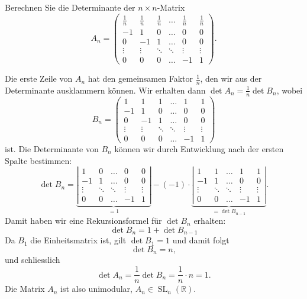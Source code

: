 Berechnen Sie die Determinante der $n\times n$-Matrix 
\[
A_n=\begin{pmatrix}
\frac1n& \frac1n& \frac1n&\dots & \frac1n& \frac1n\\
     -1&       1&       0&\dots &       0&       0\\
      0&      -1&       1&\dots &       0&       0\\
\vdots &\vdots  &\ddots  &\ddots& \vdots & \vdots \\
      0&       0&       0&\dots &      -1&       1
\end{pmatrix}.
\]


\begin{loesung}
Die erste Zeile von $A_n$ hat den gemeinsamen Faktor $\frac1n$, den
wir aus der Determinante ausklammern können.
Wir erhalten dann $\det A_n =\frac1n\det B_n $, wobei 
\[
B_n=\begin{pmatrix}
      1&       1&       1&\dots &       1&       1\\
     -1&       1&       0&\dots &       0&       0\\
      0&      -1&       1&\dots &       0&       0\\
\vdots &\vdots  &\ddots  &\ddots& \vdots & \vdots \\
      0&       0&       0&\dots &      -1&       1
\end{pmatrix}
\]
ist.
Die Determinante von $B_n$ können wir durch Entwicklung nach der ersten
Spalte bestimmen:
\[
\det B_n
=
\underbrace{
\left|\begin{matrix}
       1&       0&\dots &       0&       0\\
      -1&       1&\dots &       0&       0\\
\vdots  &\ddots  &\ddots& \vdots & \vdots \\
       0&       0&\dots &      -1&       1
\end{matrix}\right|}_{=1}
-(-1)\cdot
\underbrace{
\left|\begin{matrix}
       1&       1&\dots &       1&       1\\
      -1&       1&\dots &       0&       0\\
\vdots  &\ddots  &\ddots& \vdots & \vdots \\
       0&       0&\dots &      -1&       1
\end{matrix}\right|}_{=\det B_{n-1}}.
\]
Damit haben wir eine Rekursionsformel für $\det B_n$ erhalten:
\[
\det B_n = 1 + \det B_{n-1}
\]
Da $B_1$ die Einheitsmatrix ist, gilt $\det B_1=1$ und damit folgt
\[
\det B_n=n,
\]
und schliesslich
\[
\det A_n=\frac1n\det B_n=\frac1n\cdot n=1.
\]
Die Matrix $A_n$ ist also unimodular, $A_n\in\operatorname{SL}_n(\mathbb R)$.
\end{loesung}

